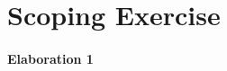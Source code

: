 \documentclass{article}
\author{Bree Kelly} \date{}
\begin{document}
\maketitle

\section*{Scoping Exercise}

\paragraph{} \noindent \large \break
\textbf{Elaboration 1}
\newline \break
\end{document}
